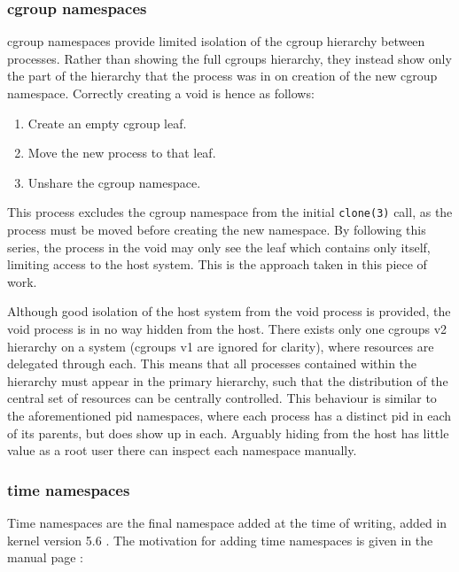 \documentclass[sigplan]{acmart}
\begin{document}
\subsubsection{cgroup namespaces}

cgroup namespaces provide limited isolation of the cgroup hierarchy between processes. Rather than showing the full cgroups hierarchy, they instead show only the part of the hierarchy that the process was in on creation of the new cgroup namespace. Correctly creating a void is hence as follows:

\begin{enumerate}
    \item Create an empty cgroup leaf.
    \item Move the new process to that leaf.
    \item Unshare the cgroup namespace.
\end{enumerate}

This process excludes the cgroup namespace from the initial \texttt{clone(3)} call, as the process must be moved before creating the new namespace. By following this series, the process in the void may only see the leaf which contains only itself, limiting access to the host system.  This is the approach taken in this piece of work.

Although good isolation of the host system from the void process is provided, the void process is in no way hidden from the host. There exists only one cgroups v2 hierarchy on a system (cgroups v1 are ignored for clarity), where resources are delegated through each. This means that all processes contained within the hierarchy must appear in the primary hierarchy, such that the distribution of the central set of resources can be centrally controlled. This behaviour is similar to the aforementioned pid namespaces, where each process has a distinct pid in each of its parents, but does show up in each. Arguably hiding from the host has little value as a root user there can inspect each namespace manually.

\subsubsection{time namespaces}
\label{sec:time-namespaces}

Time namespaces are the final namespace added at the time of writing, added in kernel version 5.6 \citep{noauthor_linux_2020}. The motivation for adding time namespaces is given in the manual page \citep{free_software_foundation_time_namespaces7_2021}:
\end{document}
